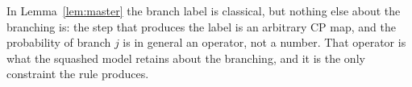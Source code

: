 
\begin{remark}\label{rem:branch-probability}
In Lemma~\ref{lem:master} the branch label is classical, but nothing else
about the branching is: the step that produces the label is an arbitrary CP
map, and the probability of branch $j$ is in general an operator, not a
number. That operator is what the squashed model retains about the branching,
and it is the only constraint the rule produces.
\end{remark}
